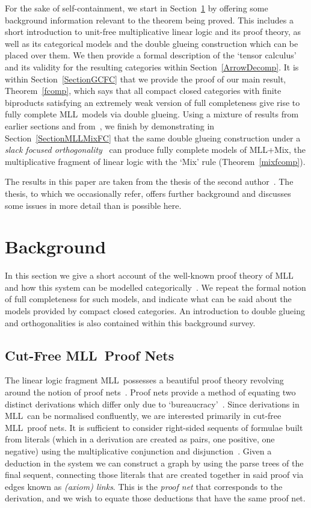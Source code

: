 \documentclass{LMCS}
\theoremstyle{plain}\newtheorem*{cLm}{Claim}
\newcommand{\mll}{MLL} \newcommand{\mall}{MALL}
\newcommand{\mllmix}{MLL+Mix} \newcommand{\GRel}{\mathbf{GRel}}
\newcommand{\p}{} \newcommand{\N}{\mathbb{N}}
\newcommand{\hughd}[1]{#1}
\newcommand{\hughg}[1]{#1}
\begin{document}
\p For the sake of self-containment, we start in Section~\ref{BackgroundSection} by offering some background information relevant to the theorem being proved. This includes a short introduction to unit-free multiplicative linear logic and its proof theory, as well as its categorical models and the double glueing construction which can be placed over them. We then provide a formal description of the `tensor calculus' and its validity for the resulting categories within Section~\ref{ArrowDecomp}. It is within Section~\ref{SectionGCFC} that we provide the proof of our main result, Theorem~\ref{fcomp}, which
says that all \hughg{compact closed categories with finite
biproducts satisfying an extremely weak version of full completeness give rise to fully complete \mll\ models via double
glueing}. Using a mixture of results from earlier sections and
from~\cite{Tan97}, we finish by demonstrating in Section~\ref{SectionMLLMixFC} that the same double glueing construction under a \emph{slack focused orthogonality}~\cite{HS03} can produce fully complete models of \mllmix, the multiplicative fragment of linear logic with the `Mix' rule (Theorem~\ref{mixfcomp}).

\p The results in this paper are taken from the thesis of the second
author~\cite{Ste13}. The thesis, to which we occasionally refer, offers further background and discusses
some issues in more detail than is possible here.

\section{Background} \label{BackgroundSection}

In this section we give a short account of the well-known proof theory of \mll\ \cite{DR89} and how this system can be modelled categorically~\cite{BFSS90,Blu93}. We repeat the
formal notion of full completeness for such models, and indicate what can be said about the models provided by compact closed categories. An introduction to double glueing and orthogonalities is also contained within this background survey.

\subsection{Cut-Free \mll~Proof Nets}

The linear logic fragment \mll\ possesses a beautiful proof theory
revolving around the notion of proof nets~\hughd{\cite{Mel06,Str06}}. Proof nets provide a
method of equating two distinct derivations which differ only due to
`bureaucracy'~\cite{Gir87}. Since derivations in \mll\ can be
normalised confluently, we are interested primarily in cut-free
\mll~proof nets. It is sufficient to consider right-sided sequents of
formulae built from literals (which in a derivation are created as
pairs, one positive, one negative) using the multiplicative
conjunction  and disjunction~. Given a deduction
in the system we can construct a graph by using the parse trees of
the final sequent, connecting those literals that are created
together in said proof via edges known as \emph{(axiom) links}. This
is the {\em proof net}\/ that corresponds to the derivation, and we
wish to equate those deductions that have the same proof net.
\end{document}
